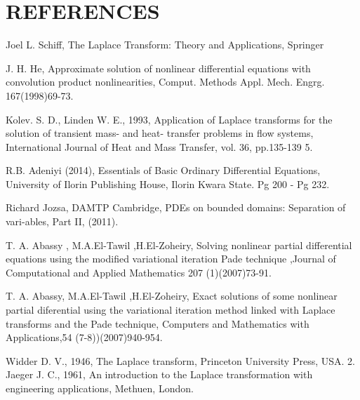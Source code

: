 \documentclass[11pt]{report}
\begin{document}
	\chapter*{REFERENCES}
	\begin{description}
		\item Joel L. Schiff, The Laplace Transform: Theory and Applications, Springer
		
		\item J. H. He, Approximate solution of nonlinear differential equations with convolution product nonlinearities, Comput. Methods Appl. Mech. Engrg. 167(1998)69-73.
		
		\item  Kolev. S. D., Linden W. E., 1993, Application of Laplace transforms for the solution of transient mass- and heat- transfer problems in flow systems, International Journal of Heat and Mass Transfer, vol. 36, pp.135-139 5. 
		
		\item R.B. Adeniyi (2014), Essentials of Basic Ordinary Differential Equations, University of Ilorin Publishing House, Ilorin Kwara State. Pg 200 - Pg 232.
		
		\item Richard Jozsa, DAMTP Cambridge, PDEs on bounded domains: Separation of vari-ables, Part II, (2011).
		
		\item T. A. Abassy , M.A.El-Tawil ,H.El-Zoheiry, Solving nonlinear partial differential equations using the modified
		variational iteration Pade technique ,Journal of Computational and Applied Mathematics 207 (1)(2007)73-91.
		
		\item T. A. Abassy, M.A.El-Tawil ,H.El-Zoheiry, Exact solutions of some nonlinear partial diferential using the
		variational iteration method linked with Laplace transforms and the Pade technique, Computers and Mathematics
		with Applications,54 (7-8))(2007)940-954.
		
		\item Widder D. V., 1946, The Laplace transform, Princeton University Press, USA. 2. Jaeger J. C., 1961, An introduction to the Laplace transformation with engineering applications, Methuen, London. 
	\end{description}
\end{document}
